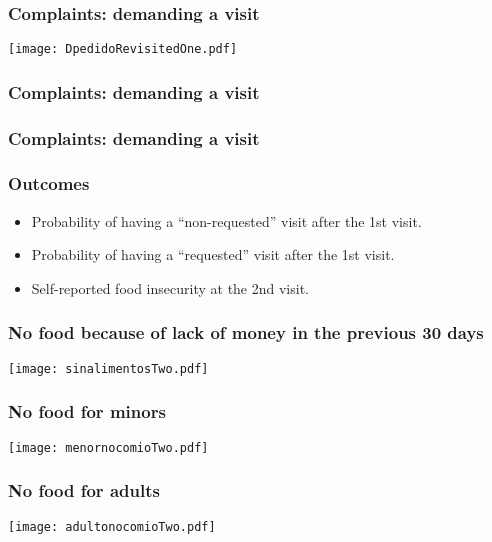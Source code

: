 \documentclass{beamer}
\begin{document}
\begin{frame}
\frametitle{Complaints: demanding a visit}
\begin{center}
	\texttt{[image: DpedidoRevisitedOne.pdf]}
	\label{DpedidoRevisitedOne}
\end{center}
\end{frame}

\begin{frame}
\frametitle{Complaints: demanding a visit}
\begin{figure}
	
\end{figure}
\end{frame}

\begin{frame}
\frametitle{Complaints: demanding a visit}
\begin{figure}
	
\end{figure}
\end{frame}

\begin{frame}
\frametitle{Outcomes}
\begin{itemize}
	\item {\color{gray}Probability of having a ``non-requested'' visit after the 1st visit.}
	\item {\color{gray}Probability of having a ``requested'' visit after the 1st visit.}
	\item Self-reported food insecurity at the 2nd visit.
\end{itemize}
\end{frame}

\begin{frame}
\frametitle{No food because of lack of money in the previous 30 days}
\begin{center}
	\texttt{[image: sinalimentosTwo.pdf]}
	\label{sinalimentosTwo}
\end{center}
\end{frame}

\begin{frame}
\frametitle{No food for minors}
\begin{center}
\texttt{[image: menornocomioTwo.pdf]}
\label{menornocomioTwo}
\end{center}
\end{frame}

\begin{frame}
\frametitle{No food for adults}
\begin{center}
	\texttt{[image: adultonocomioTwo.pdf]}
	\label{adultonocomioTwo}
\end{center}
\end{frame}
\end{document}
